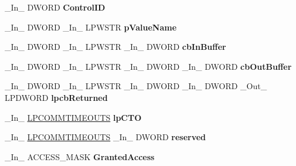 \begin{DoxyCompactItemize}
\item 
\mbox{\label{struct___m_o_n_i_t_o_r_a81278f89c0960da2d68647394c357102}} 
\+\_\+\+In\+\_\+ D\+W\+O\+RD {\bfseries Control\+ID}
\item 
\mbox{\label{struct___m_o_n_i_t_o_r_a1d9ba59ccf412167bb5197f263d9f799}} 
\+\_\+\+In\+\_\+ D\+W\+O\+RD \+\_\+\+In\+\_\+ L\+P\+W\+S\+TR {\bfseries p\+Value\+Name}
\item 
\mbox{\label{struct___m_o_n_i_t_o_r_a5fea1c7d2655b1ecb9fde3d9d0d555b8}} 
\+\_\+\+In\+\_\+ D\+W\+O\+RD \+\_\+\+In\+\_\+ L\+P\+W\+S\+TR \+\_\+\+In\+\_\+ D\+W\+O\+RD {\bfseries cb\+In\+Buffer}
\item 
\mbox{\label{struct___m_o_n_i_t_o_r_a3aecce2c47ee7437912ef3b5ccff6050}} 
\+\_\+\+In\+\_\+ D\+W\+O\+RD \+\_\+\+In\+\_\+ L\+P\+W\+S\+TR \+\_\+\+In\+\_\+ D\+W\+O\+RD \+\_\+\+In\+\_\+ D\+W\+O\+RD {\bfseries cb\+Out\+Buffer}
\item 
\mbox{\label{struct___m_o_n_i_t_o_r_adaf2a9cb98ff56ce3faab5856f281a33}} 
\+\_\+\+In\+\_\+ D\+W\+O\+RD \+\_\+\+In\+\_\+ L\+P\+W\+S\+TR \+\_\+\+In\+\_\+ D\+W\+O\+RD \+\_\+\+In\+\_\+ D\+W\+O\+RD \+\_\+\+Out\+\_\+ L\+P\+D\+W\+O\+RD {\bfseries lpcb\+Returned}
\item 
\mbox{\label{struct___m_o_n_i_t_o_r_acf333b7f7105a88e25d4315dca181fcc}} 
\+\_\+\+In\+\_\+ \hyperlink{struct___c_o_m_m_t_i_m_e_o_u_t_s}{L\+P\+C\+O\+M\+M\+T\+I\+M\+E\+O\+U\+TS} {\bfseries lp\+C\+TO}
\item 
\mbox{\label{struct___m_o_n_i_t_o_r_a16ce47b0aad61c91c15187b6feeb58d5}} 
\+\_\+\+In\+\_\+ \hyperlink{struct___c_o_m_m_t_i_m_e_o_u_t_s}{L\+P\+C\+O\+M\+M\+T\+I\+M\+E\+O\+U\+TS} \+\_\+\+In\+\_\+ D\+W\+O\+RD {\bfseries reserved}
\item 
\mbox{\label{struct___m_o_n_i_t_o_r_af2546adab63878a1f974fc9597bb3d30}} 
\+\_\+\+In\+\_\+ A\+C\+C\+E\+S\+S\+\_\+\+M\+A\+SK {\bfseries Granted\+Access}
\item 
\mbox{\label{struct___m_o_n_i_t_o_r_a36d9850b368e0c858832c2ffa8c3f761}} 

\end{DoxyCompactItemize}
